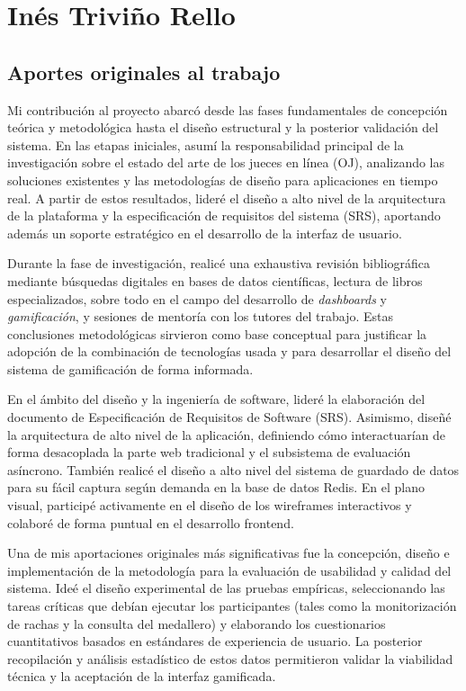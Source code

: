 \section*{Inés Triviño Rello}

\subsection*{Aportes originales al trabajo}
Mi contribución al proyecto abarcó desde las fases fundamentales de concepción teórica y metodológica hasta el diseño estructural y la posterior validación del sistema. En las etapas iniciales, asumí la responsabilidad principal de la investigación sobre el estado del arte de los jueces en línea (OJ), analizando las soluciones existentes y las metodologías de diseño para aplicaciones en tiempo real. A partir de estos resultados, lideré el diseño a alto nivel de la arquitectura de la plataforma y la especificación de requisitos del sistema (SRS), aportando además un soporte estratégico en el desarrollo de la interfaz de usuario.

Durante la fase de investigación, realicé una exhaustiva revisión bibliográfica mediante búsquedas digitales en bases de datos científicas, lectura de libros especializados, sobre todo en el campo del desarrollo de \textit{dashboards} y \textit{gamificación}, y sesiones de mentoría con los tutores del trabajo. Estas conclusiones metodológicas sirvieron como base conceptual para justificar la adopción de la combinación de tecnologías usada y para desarrollar el diseño del sistema de gamificación de forma informada. 

En el ámbito del diseño y la ingeniería de software, lideré la elaboración del documento de Especificación de Requisitos de Software (SRS). Asimismo, diseñé la arquitectura de alto nivel de la aplicación, definiendo cómo interactuarían de forma desacoplada la parte web tradicional y el subsistema de evaluación asíncrono. También realicé el diseño a alto nivel del sistema de guardado de datos para su fácil captura según demanda en la base de datos Redis. En el plano visual, participé activamente en el diseño de los wireframes interactivos y colaboré de forma puntual en el desarrollo frontend.

Una de mis aportaciones originales más significativas fue la concepción, diseño e implementación de la metodología para la evaluación de usabilidad y calidad del sistema. Ideé el diseño experimental de las pruebas empíricas, seleccionando las tareas críticas que debían ejecutar los participantes (tales como la monitorización de rachas y la consulta del medallero) y elaborando los cuestionarios cuantitativos basados en estándares de experiencia de usuario. La posterior recopilación y análisis estadístico de estos datos permitieron validar la viabilidad técnica y la aceptación de la interfaz gamificada.

